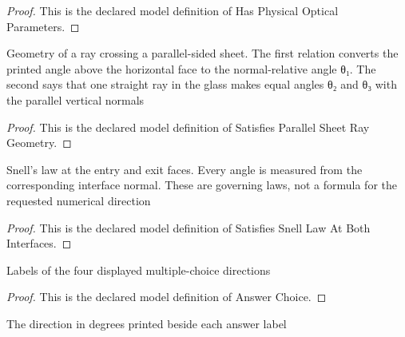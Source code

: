 \begin{proof}
  This is the declared model definition of Has Physical Optical Parameters.
\end{proof}
\begin{definition}
  \label{def:physics:phyx-mini-0155:phyxminiproblems-problemphyxmini0155-satisfiesparallelsheetraygeometry}
  Geometry of a ray crossing a parallel-sided sheet. The first relation converts the printed angle above the horizontal face to the normal-relative angle θ₁. The second says that one straight ray in the glass makes equal angles θ₂ and θ₃ with the parallel vertical normals
\end{definition}
\begin{proof}
  This is the declared model definition of Satisfies Parallel Sheet Ray Geometry.
\end{proof}
\begin{definition}
  \label{def:physics:phyx-mini-0155:phyxminiproblems-problemphyxmini0155-satisfiessnelllawatbothinterfaces}
  Snell's law at the entry and exit faces. Every angle is measured from the corresponding interface normal. These are governing laws, not a formula for the requested numerical direction
\end{definition}
\begin{proof}
  This is the declared model definition of Satisfies Snell Law At Both Interfaces.
\end{proof}
\begin{definition}
  \label{def:physics:phyx-mini-0155:phyxminiproblems-problemphyxmini0155-answerchoice}
  Labels of the four displayed multiple-choice directions
\end{definition}
\begin{proof}
  This is the declared model definition of Answer Choice.
\end{proof}
\begin{definition}
  \label{def:physics:phyx-mini-0155:phyxminiproblems-problemphyxmini0155-displayeddirectionindegrees}
  The direction in degrees printed beside each answer label
\end{definition}
